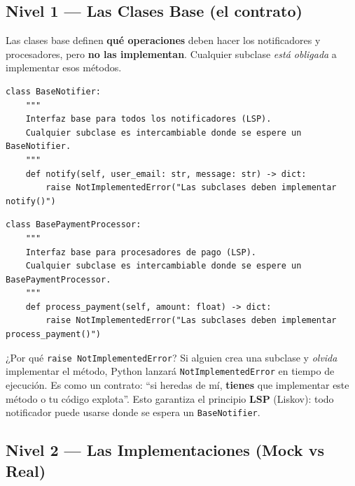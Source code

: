 \documentclass[12pt, a4paper]{article}
\begin{document}
\subsection{Nivel 1 — Las Clases Base (el contrato)}

Las clases base definen \textbf{qué operaciones} deben hacer los notificadores y
procesadores, pero \textbf{no las implementan}. Cualquier subclase \textit{está
obligada} a implementar esos métodos.

\begin{lstlisting}[caption={orders/infra/notifiers.py -- BaseNotifier}]
class BaseNotifier:
    """
    Interfaz base para todos los notificadores (LSP).
    Cualquier subclase es intercambiable donde se espere un BaseNotifier.
    """
    def notify(self, user_email: str, message: str) -> dict:
        raise NotImplementedError("Las subclases deben implementar notify()")
\end{lstlisting}

\begin{lstlisting}[caption={orders/infra/payment.py -- BasePaymentProcessor}]
class BasePaymentProcessor:
    """
    Interfaz base para procesadores de pago (LSP).
    Cualquier subclase es intercambiable donde se espere un BasePaymentProcessor.
    """
    def process_payment(self, amount: float) -> dict:
        raise NotImplementedError("Las subclases deben implementar process_payment()")
\end{lstlisting}

\begin{conceptbox}{¿Por qué \texttt{raise NotImplementedError}?}
Si alguien crea una subclase y \textit{olvida} implementar el método, Python
lanzará \texttt{NotImplementedError} en tiempo de ejecución. Es como un
contrato: ``si heredas de mí, \textbf{tienes} que implementar este método o
tu código explota''. Esto garantiza el principio \textbf{LSP} (Liskov):
todo notificador puede usarse donde se espera un \texttt{BaseNotifier}.
\end{conceptbox}

\subsection{Nivel 2 — Las Implementaciones (Mock vs Real)}
\end{document}

